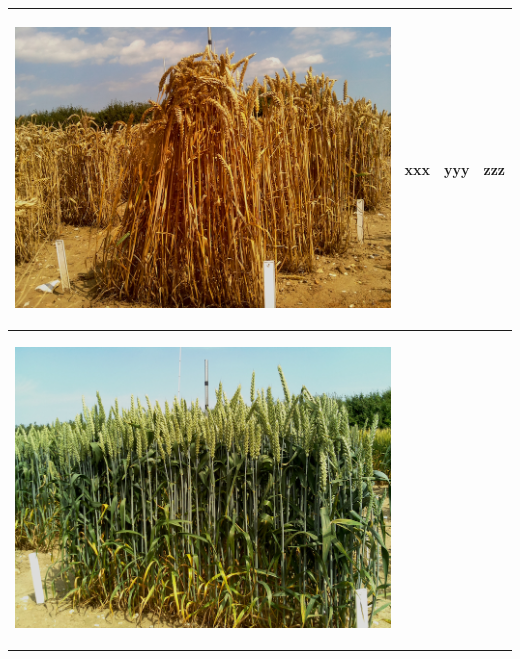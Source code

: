 \begin{table}[ht!]
\begin{tabular}{ | c | c | c | c |}
\begin{minipage}{.3\textwidth}
\begin{center}
		\includegraphics[width=\linewidth]{Images/011}
      \end{center}
    \end{minipage}
    &
      xxx
    & 
      yyy
    & 
      zzz
    \\ \hline
    \begin{minipage}{.3\textwidth}
      \begin{center}
		\includegraphics[width=\linewidth]{Images/012}

\end{center}
\end{minipage}
\end{tabular}
\end{table}
